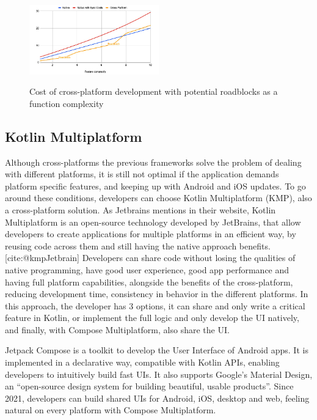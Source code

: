 \begin{figure}[h]
    \caption{Cost of cross-platform development with potential roadblocks as a function complexity\cite{Nagy2022}}
    \centering
    \includegraphics[width=0.5\textwidth]{figs/Figure_1.6_B17614_cost_of_cross}
    \label{fig:costCross}
\end{figure}


\subsection{Kotlin Multiplatform}\label{subsec:kotlin-multiplatform}

Although cross-platforms the previous frameworks solve the problem of dealing with different platforms, it is still not optimal if the application demands platform specific features, and keeping up with Android and iOS updates.
To go around these conditions, developers can choose Kotlin Multiplatform (KMP), also a cross-platform solution.
As Jetbrains mentions in their website, Kotlin Multiplatform is an open-source technology developed by JetBrains, that allow developers to create applications for multiple platforms in an efficient way, by reusing code across them and still having the native approach benefits.[cite:@kmpJetbrain]
Developers can share code without losing the qualities of native programming, have good user experience, good app performance and having full platform capabilities, alongside the benefits of the cross-platform, reducing development time, consistency in behavior in the different platforms.
In this approach, the developer has 3 options, it can share and only write a critical feature in Kotlin, or implement the full logic and only develop the UI natively, and finally, with Compose Multiplatform, also share the UI.\cite{kmp}

Jetpack Compose\cite{jetpack} is a toolkit to develop the User Interface of Android apps.
It is implemented in a declarative way, compatible with Kotlin APIs, enabling developers to intuitively build fast UIs.
It also supports Google's Material Design, an ``open-source design system for building beautiful, usable products''\cite{materialD}.
Since 2021, developers can build shared UIs for Android, iOS, desktop and web, feeling natural on every platform with Compose Multiplatform.\cite{compose-multi}

